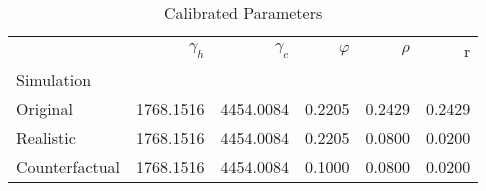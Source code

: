 \begin{table}
\centering
\caption{Calibrated Parameters}
\label{tab:calibs}
\begin{tabular}{lrrrrr}
\toprule
{} & $\gamma_h$ & $\gamma_c$ & $\varphi$ & $\rho$ &      r \\
Simulation     &            &            &           &        &        \\
\midrule
Original       &  1768.1516 &  4454.0084 &    0.2205 & 0.2429 & 0.2429 \\
Realistic      &  1768.1516 &  4454.0084 &    0.2205 & 0.0800 & 0.0200 \\
Counterfactual &  1768.1516 &  4454.0084 &    0.1000 & 0.0800 & 0.0200 \\
\bottomrule
\end{tabular}
\end{table}
